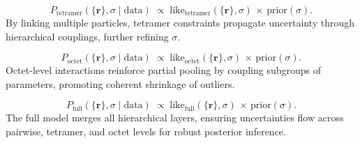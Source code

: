 \documentclass[12pt]{article}
\begin{document}
    \begin{equation}
    P_{\text{tetramer}}(\{\mathbf{r}\},\sigma \mid \text{data})
    \;\propto\;
    \mathrm{like}_{\text{tetramer}}(\{\mathbf{r}\},\sigma)\,\times\,\mathrm{prior}(\sigma).
    \end{equation}
    By linking multiple particles, tetramer constraints propagate uncertainty through hierarchical couplings, further refining $\sigma$.
    
    \begin{equation}
    P_{\text{octet}}(\{\mathbf{r}\},\sigma \mid \text{data})
    \;\propto\;
    \mathrm{like}_{\text{octet}}(\{\mathbf{r}\},\sigma)\,\times\,\mathrm{prior}(\sigma).
    \end{equation}
    Octet-level interactions reinforce partial pooling by coupling subgroups of parameters, promoting coherent shrinkage of outliers.
    
    \begin{equation}
    P_{\text{full}}(\{\mathbf{r}\},\sigma \mid \text{data})
    \;\propto\;
    \mathrm{like}_{\text{full}}(\{\mathbf{r}\},\sigma)\,\times\,\mathrm{prior}(\sigma).
    \end{equation}
    The full model merges all hierarchical layers, ensuring uncertainties flow across pairwise, tetramer, and octet levels for robust posterior inference.

\end{document}

